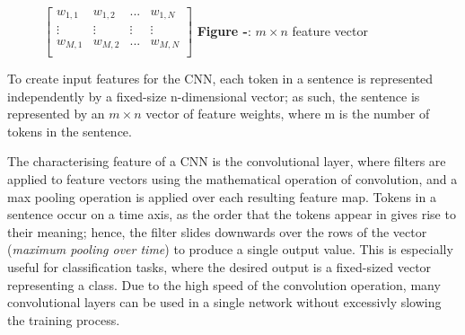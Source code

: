 \documentclass[12pt,a4paper]{article}
\begin{document}
\hspace{-20pt}\begin{minipage}{0.35\textwidth}
	\vspace{-5pt}\begin{figure}[H]
		\begin{center}
			$
			\begin{bmatrix}
			w_{1,1} & w_{1,2} & ... & w_{1,N}\\
			\vdots & \vdots & \vdots & \vdots \\
			w_{M, 1} & w_{M, 2} & ... & w_{M, N} \\
			\end{bmatrix}
			$\vspace{5pt}
			\textbf{Figure -}: $m \times n$ feature vector\\
		\end{center}
	\end{figure}
\end{minipage} \hfill
\begin{minipage}{0.62\textwidth}
	\vspace{-8pt}
	To create input features for the CNN, each token in a sentence is represented independently by a fixed-size n-dimensional vector; as such, the sentence is represented by an $m \times n$ vector of feature weights, where m is the number of tokens in the sentence.
\end{minipage}\vspace{-5pt}

\noindent The characterising feature of a CNN is the convolutional layer, where filters are applied to feature vectors using the mathematical operation of convolution, and a max pooling operation is applied over each resulting feature map. Tokens in a sentence occur on a time axis, as the order that the tokens appear in gives rise to their meaning; hence, the filter slides downwards over the rows of the vector (\textit{maximum pooling over time}) to produce a single output value. This is especially useful for classification tasks, where the desired output is a fixed-sized vector representing a class. Due to the high speed of the convolution operation, many convolutional layers can be used in a single network without excessivly slowing the training process.\\\vspace{-8pt}
\end{document}

